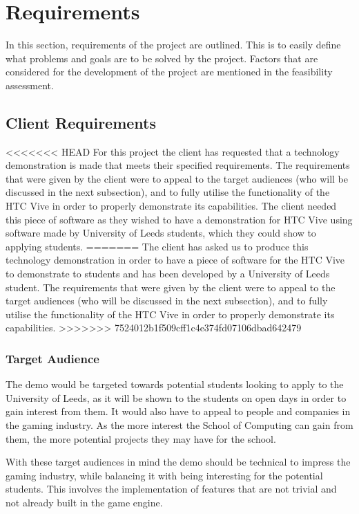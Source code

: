 \chapter{Requirements}
\label{chapter3}

In this section, requirements of the project are outlined. This is to easily define what problems and goals are to be solved by the project. Factors that are considered for the development of the project are mentioned in the feasibility assessment.

\section{Client Requirements}

<<<<<<< HEAD
For this project the client has requested that a technology demonstration is made that meets their specified requirements. The requirements that were given by the client were to appeal to the target audiences (who will be discussed in the next subsection), and to fully utilise the functionality of the HTC Vive in order to properly demonstrate its capabilities. The client needed this piece of software as they wished to have a demonstration for HTC Vive using software made by University of Leeds students, which they could show to applying students.
=======
The client has asked us to produce this technology demonstration in order to have a piece of software for the HTC Vive to demonstrate to students and has been developed by a University of Leeds student. The requirements that were given by the client were to appeal to the target audiences (who will be discussed in the next subsection), and to fully utilise the functionality of the HTC Vive in order to properly demonstrate its capabilities.
>>>>>>> 7524012b1f509cff1c4e374fd07106dbad642479

\subsection{Target Audience}
The demo would be targeted towards potential students looking to apply to the University of Leeds, as it will be shown to the students on open days in order to gain interest from them.
It would also have to appeal to people and companies in the gaming industry. As the more interest the School of Computing can gain from them, the more potential projects they may have for the school.
\newline
\par
With these target audiences in mind the demo should be technical to impress the gaming industry, while balancing it with being interesting for the potential students. This involves the implementation of features that are not trivial and not already built in the game engine.

